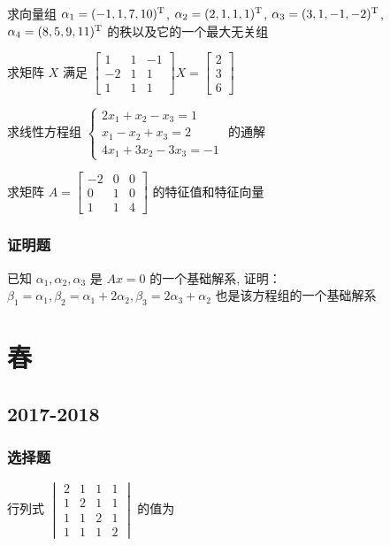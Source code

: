 \begin{ti}
	求向量组 $\alpha_1 = (-1,1,7,10)^{\mathrm{T}}$, $\alpha_2 = (2,1,1,1)^{\mathrm{T}}$, $\alpha_3 = (3,1,-1,-2)^{\mathrm{T}}$, $\alpha_4 = (8,5,9,11)^{\mathrm{T}}$ 的秩以及它的一个最大无关组
\end{ti}

\begin{ti}
	求矩阵 $X$ 满足 $\begin{bmatrix}
		1 & 1 & -1 \\
		-2 & 1 & 1 \\
		1 & 1 & 1
	\end{bmatrix} X = \begin{bmatrix}
		2 \\ 3 \\ 6
	\end{bmatrix}$
\end{ti}

\begin{ti}
	求线性方程组 $\begin{cases}
		2x_1 + x_2 - x_3 = 1 \\
		x_1 - x_2 + x_3 = 2 \\
		4x_1 + 3x_2 - 3x_3 = -1
	\end{cases}$ 的通解
\end{ti}

\begin{ti}
	求矩阵 $A = \begin{bmatrix}
		-2 & 0 & 0 \\
		0 & 1 & 0 \\
		1 & 1 & 4
	\end{bmatrix}$ 的特征值和特征向量
\end{ti}

\subsubsection{证明题}
\begin{ti}
	已知 $\alpha_1,\alpha_2,\alpha_3$ 是 $Ax=0$ 的一个基础解系, 证明：$\beta_1 = \alpha_1,\beta_2 = \alpha_1 + 2\alpha_2, \beta_3 = 2\alpha_3 + \alpha_2$ 也是该方程组的一个基础解系
\end{ti}

\section{春}
\subsection{2017-2018}
\subsubsection{选择题}
\begin{ti}
	行列式 $\begin{vmatrix}
		2 & 1 & 1 & 1 \\
		1 & 2 & 1 & 1 \\
		1 & 1 & 2 & 1 \\
		1 & 1 & 1 & 2
	\end{vmatrix}$ 的值为 \kuo
\end{ti}

